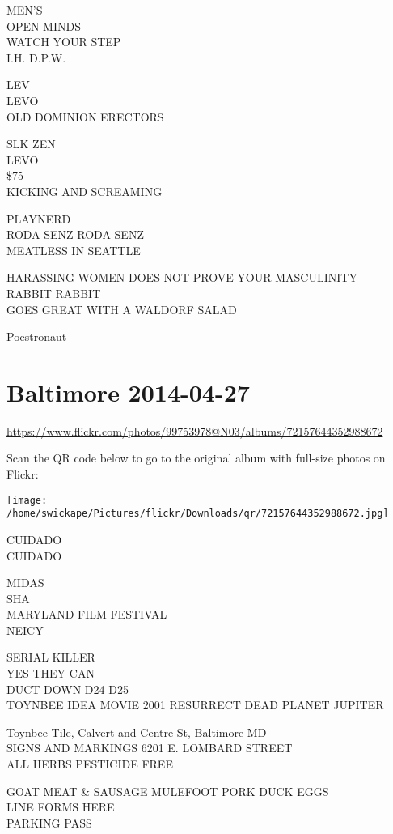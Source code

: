 \documentclass[10pt,letterpaper]{article}
\begin{document}
MEN'S\\
OPEN MINDS\\
WATCH YOUR STEP\\
I.H. D.P.W.

LEV\\
LEVO\\
OLD DOMINION ERECTORS

SLK ZEN\\
LEVO\\
\$75\\
KICKING AND SCREAMING

PLAYNERD\\
RODA SENZ RODA SENZ\\
MEATLESS IN SEATTLE

HARASSING WOMEN DOES NOT PROVE YOUR MASCULINITY\\
RABBIT RABBIT\\
GOES GREAT WITH A WALDORF SALAD

Poestronaut
\pagebreak

\section*{Baltimore 2014-04-27}

\url{https://www.flickr.com/photos/99753978@N03/albums/72157644352988672}

Scan the QR code below to go to the original album with full-size photos on Flickr:

\texttt{[image: /home/swickape/Pictures/flickr/Downloads/qr/72157644352988672.jpg]}
\pagebreak

CUIDADO\\
CUIDADO

MIDAS\\
SHA\\
MARYLAND FILM FESTIVAL\\
NEICY

SERIAL KILLER\\
YES THEY CAN\\
DUCT DOWN D24{-}D25\\
TOYNBEE IDEA MOVIE 2001 RESURRECT DEAD PLANET JUPITER

Toynbee Tile, Calvert and Centre St, Baltimore MD\\
SIGNS AND MARKINGS 6201 E. LOMBARD STREET\\
ALL HERBS PESTICIDE FREE

GOAT MEAT \& SAUSAGE MULEFOOT PORK DUCK EGGS\\
LINE FORMS HERE\\
PARKING PASS
\end{document}
